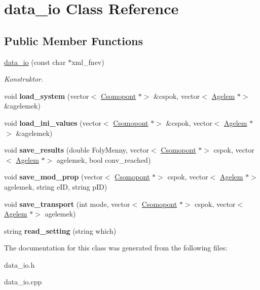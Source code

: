 \hypertarget{classdata__io}{}\section{data\+\_\+io Class Reference}
\label{classdata__io}
\subsection*{Public Member Functions}
\begin{DoxyCompactItemize}
\item 
\hypertarget{classdata__io_ab2af4a1c42da224e002c9221f7117129}{}\label{classdata__io_ab2af4a1c42da224e002c9221f7117129} 
\hyperlink{classdata__io_ab2af4a1c42da224e002c9221f7117129}{data\+\_\+io} (const char $\ast$xml\+\_\+fnev)
\begin{DoxyCompactList}\small\item\em Konstruktor. \end{DoxyCompactList}\item 
\hypertarget{classdata__io_a6b94381a36f297a3c3014fd593035581}{}\label{classdata__io_a6b94381a36f297a3c3014fd593035581} 
void {\bfseries load\+\_\+system} (vector$<$ \hyperlink{class_csomopont}{Csomopont} $\ast$$>$ \&cspok, vector$<$ \hyperlink{class_agelem}{Agelem} $\ast$$>$ \&agelemek)
\item 
\hypertarget{classdata__io_a3941963428eab44f1c3c05f3647c9193}{}\label{classdata__io_a3941963428eab44f1c3c05f3647c9193} 
void {\bfseries load\+\_\+ini\+\_\+values} (vector$<$ \hyperlink{class_csomopont}{Csomopont} $\ast$$>$ \&cspok, vector$<$ \hyperlink{class_agelem}{Agelem} $\ast$$>$ \&agelemek)
\item 
\hypertarget{classdata__io_a694062a0c53097863dfaa8306573ff0c}{}\label{classdata__io_a694062a0c53097863dfaa8306573ff0c} 
void {\bfseries save\+\_\+results} (double Foly\+Menny, vector$<$ \hyperlink{class_csomopont}{Csomopont} $\ast$$>$ cspok, vector$<$ \hyperlink{class_agelem}{Agelem} $\ast$$>$ agelemek, bool conv\+\_\+reached)
\item 
\hypertarget{classdata__io_ae269760bfd397b8fba4012e3ed2d5333}{}\label{classdata__io_ae269760bfd397b8fba4012e3ed2d5333} 
void {\bfseries save\+\_\+mod\+\_\+prop} (vector$<$ \hyperlink{class_csomopont}{Csomopont} $\ast$$>$ cspok, vector$<$ \hyperlink{class_agelem}{Agelem} $\ast$$>$ agelemek, string e\+ID, string p\+ID)
\item 
\hypertarget{classdata__io_a15627ef79b47a8afeb33f01fa15457fd}{}\label{classdata__io_a15627ef79b47a8afeb33f01fa15457fd} 
void {\bfseries save\+\_\+transport} (int mode, vector$<$ \hyperlink{class_csomopont}{Csomopont} $\ast$$>$ cspok, vector$<$ \hyperlink{class_agelem}{Agelem} $\ast$$>$ agelemek)
\item 
\hypertarget{classdata__io_a2bef52b6a28b450a5887c0483ff1e4a7}{}\label{classdata__io_a2bef52b6a28b450a5887c0483ff1e4a7} 
string {\bfseries read\+\_\+setting} (string which)
\end{DoxyCompactItemize}


The documentation for this class was generated from the following files\+:\begin{DoxyCompactItemize}
\item 
data\+\_\+io.\+h\item 
data\+\_\+io.\+cpp\end{DoxyCompactItemize}
